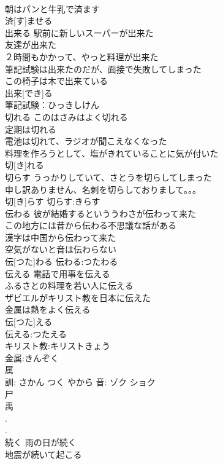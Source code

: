 \documentclass[8pt]{extreport}
\begin{document}
\begin{CJK}{UTF8}{min}
\\	朝はパンと牛乳で済ます 
\\	済[す]ませる						
\\	出来る	駅前に新しいスーパーが出来た 
\\	友達が出来た 
\\	２時間もかかって、やっと料理が出来た 
\\	筆記試験は出来たのだが、面接で失敗してしまった 
\\	この椅子は木で出来ている 
\\	出来[でき]る		
\\	筆記試験：ひっきしけん
\\	切れる	このはさみはよく切れる 
\\	定期は切れる 
\\	電池は切れて、ラジオが聞こえなくなった 
\\	料理を作ろうとして、塩がきれていることに気が付いた 
\\	切[き]れる						
\\	切らす	うっかりしていて、さとうを切らしてしまった 
\\	申し訳ありません、名刺を切らしておりまして。。。 
\\	切[き]らす			切らす:きらす
\\	伝わる	彼が結婚するといううわさが伝わって来た 
\\	この地方には昔から伝わる不思議な話がある 
\\	漢字は中国から伝わって来た 
\\	空気がないと音は伝わらない 
\\	伝[つた]わる			伝わる:つたわる
\\	伝える	電話で用事を伝える 
\\	ふるさとの料理を若い人に伝える 
\\	ザビエルがキリスト教を日本に伝えた 
\\	金属は熱をよく伝える 
\\	伝[つた]える		
\\	伝える:つたえる
\\	キリスト教:キリストきょう
\\	金属:きんぞく
\\	属 
\\	訓: さかん つく やから 音: ゾク ショク 
\\	尸 
\\	禹 
\\	[屬]. 
\\	[屬].	
\\	続く	雨の日が続く 
\\	地震が続いて起こる 

\end{CJK}
\end{document}
